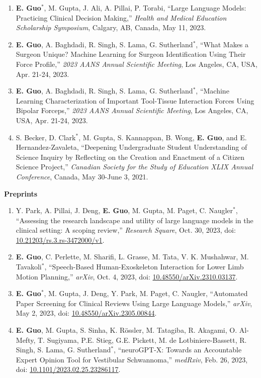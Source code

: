 \documentclass{article}
\begin{document}
\begin{enumerate}
    \item \textbf{E. Guo$^*$}, M. Gupta, J. Ali, A. Pillai, P. Torabi, ``Large Language Models: Practicing Clinical Decision Making,'' \textit{Health and Medical Education Scholarship Symposium}, Calgary, AB, Canada, May 11, 2023.
    \item \textbf{E. Guo}, A. Baghdadi, R. Singh, S. Lama, G. Sutherland$^*$, ``What Makes a Surgeon Unique? Machine Learning for Surgeon Identification Using Their Force Profile,'' \textit{2023 AANS Annual Scientific Meeting}, Los Angeles, CA, USA, Apr. 21-24, 2023.
    \item \textbf{E. Guo}, A. Baghdadi, R. Singh, S. Lama, G. Sutherland$^*$, ``Machine Learning Characterization of Important Tool-Tissue Interaction Forces Using Bipolar Forceps,'' \textit{2023 AANS Annual Scientific Meeting}, Los Angeles, CA, USA, Apr. 21-24, 2023.
    \item S. Becker, D. Clark$^*$, M. Gupta, S. Kannappan, B. Wong, \textbf{E. Guo}, and E. Hernandez-Zavaleta, ``Deepening Undergraduate Student Understanding of Science Inquiry by Reflecting on the Creation and Enactment of a Citizen Science Project,'' \textit{Canadian Society for the Study of Education XLIX Annual Conference}, Canada, May 30-June 3, 2021.
\end{enumerate} \vspace{1em}

\textbf{Preprints} \vspace{.5em}

\begin{enumerate}
    \item Y. Park, A. Pillai, J. Deng, \textbf{E. Guo}, M. Gupta, M. Paget, C. Naugler$^*$, ``Assessing the research landscape and utility of large language models in the clinical setting: A scoping review,'' \textit{Research Square}, Oct. 30, 2023, doi: \href{https://doi.org/10.21203/rs.3.rs-3472000/v1}{10.21203/rs.3.rs-3472000/v1}.
    \item \textbf{E. Guo}, C. Perlette, M. Sharifi, L. Grasse, M. Tata, V. K. Mushahwar, M. Tavakoli$^*$, ``Speech-Based Human-Exoskeleton Interaction for Lower Limb Motion Planning,'' \textit{arXiv}, Oct. 4, 2023, doi: \href{https://doi.org/10.48550/arXiv.2310.03137}{10.48550/arXiv.2310.03137}.
    \item \textbf{E. Guo}$^*$, M. Gupta, J. Deng, Y. Park, M. Paget, C. Naugler, ``Automated Paper Screening for Clinical Reviews Using Large Language Models,'' \textit{arXiv}, May 2, 2023, doi: \href{https://doi.org/10.48550/arXiv.2305.00844}{10.48550/arXiv.2305.00844}.
    \item \textbf{E. Guo}, M. Gupta, S. Sinha, K. R\"ossler, M. Tatagiba, R. Akagami, O. Al-Mefty, T. Sugiyama, P.E. Stieg, G.E. Pickett, M. de Lotbiniere-Bassett, R. Singh, S. Lama, G. Sutherland$^*$, ``neuroGPT-X: Towards an Accountable Expert Opinion Tool for Vestibular Schwannoma,'' \textit{medRxiv}, Feb. 26, 2023, doi: \href{https://doi.org/10.1101/2023.02.25.23286117}{10.1101/2023.02.25.23286117}.
\end{enumerate} \vspace{1em}
\end{document}
